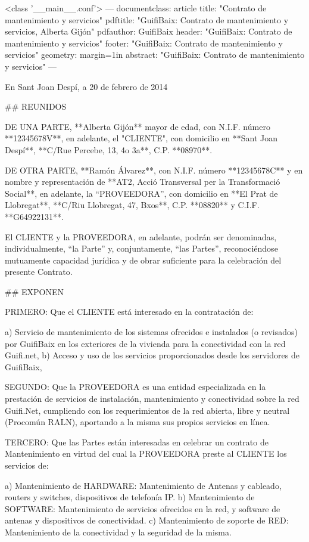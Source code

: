 <class '__main__.conf'>
---
documentclass: article
title: "Contrato de mantenimiento y servicios"
pdftitle: "GuifiBaix: Contrato de mantenimiento y servicios, Alberta Gijón"
pdfauthor: GuifiBaix
header: "GuifiBaix: Contrato de mantenimiento y servicios"
footer:	"GuifiBaix: Contrato de mantenimiento y servicios"
geometry: margin=1in
abstract: "GuifiBaix: Contrato de mantenimiento y servicios"
---

En Sant Joan Despí, a 20 de febrero de 2014


## REUNIDOS

DE UNA  PARTE,
**Alberta Gijón** mayor de edad,
con N.I.F. número **12345678V**,
en adelante, el "CLIENTE",
con domicilio en **Sant Joan Despí**,
**C/Rue Percebe, 13, 4o 3a**,
C.P. **08970**.

DE OTRA  PARTE,
**Ramón Álvarez**,
con N.I.F. número **12345678C**
y en nombre y representación de **AT2, Acció Transversal per la Transformació Social**,
en adelante, la “PROVEEDORA”,
con domicilio en **El Prat de Llobregat**,
**C/Riu Llobregat, 47, Bxos**,
C.P. **08820**
y C.I.F. **G64922131**.

El CLIENTE y la PROVEEDORA, en adelante, podrán ser denominadas,
individualmente, “la Parte” y, conjuntamente, “las Partes”,
reconociéndose mutuamente capacidad jurídica y de obrar suficiente
para la celebración del presente Contrato.

## EXPONEN

PRIMERO: Que el CLIENTE está interesado en la contratación de:

a) Servicio de mantenimiento de los sistemas ofrecidos e instalados (o revisados) por GuifiBaix en los exteriores de la vivienda para la conectividad con la red Guifi.net,
b) Acceso y uso de los servicios proporcionados desde los servidores de GuifiBaix,

SEGUNDO: Que la PROVEEDORA es una entidad especializada en la prestación de servicios de instalación, mantenimiento y conectividad sobre la red Guifi.Net, cumpliendo
con los requerimientos de la red abierta, libre y neutral (Procomún RALN), aportando a la misma sus propios servicios en línea.

TERCERO: Que las Partes están interesadas en celebrar un contrato de Mantenimiento en virtud del cual la PROVEEDORA preste al CLIENTE los servicios de:

a) Mantenimiento de HARDWARE: Mantenimiento de Antenas y cableado, routers y switches, dispositivos de telefonía IP.
b) Mantenimiento de SOFTWARE: Mantenimiento de servicios ofrecidos en la red, y software de antenas y dispositivos de conectividad.
c) Mantenimiento de soporte de RED: Mantenimiento de la conectividad y la seguridad de la misma.


